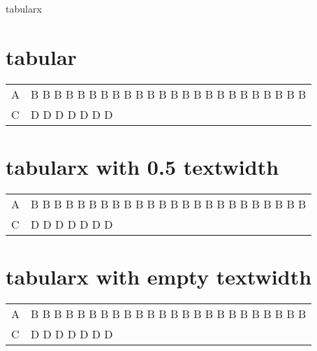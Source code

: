 \documentclass{article}
\begin{document}
tabularx

\section{tabular}
\begin{center}
\begin{tabular}{|l|p{2cm}|}
    \hline
    A & B B B B B B B B B B B B B B B B B B B B B B B B \\
    C & D D D D D D D                                   \\
    \hline
\end{tabular}
\end{center}

\section{tabularx with 0.5 textwidth}
\begin{center}
\begin{tabularx}{.5\textwidth}{|l|X|}
    \hline
    A & B B B B B B B B B B B B B B B B B B B B B B B B \\
    C & D D D D D D D                                   \\
    \hline
\end{tabularx}
\end{center}

\section{tabularx with empty textwidth}
\begin{center}
\begin{tabularx}{\textwidth}{|l|X|}
    \hline
    A & B B B B B B B B B B B B B B B B B B B B B B B B \\
    C & D D D D D D D                                   \\
    \hline
\end{tabularx}
\end{center}
\end{document}
